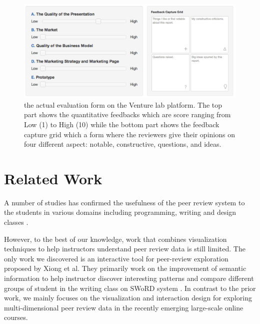 \documentclass{sigchi}
\begin{document}
\begin{figure}[!t]
\centering
\includegraphics[width=\columnwidth]{images/review-form}
\caption{the actual evaluation form on the Venture lab platform.
The top part shows the quantitative feedbacks which are score ranging
from Low (1) to High (10) while the bottom part shows the feedback capture grid
which a form where the reviewers give their opinions
on four different aspect: notable, constructive, questions, and ideas.}
\label{fig:review-form}
\end{figure}


\section{Related Work}

A number of studies has confirmed the usefulness of the peer review system
to the students in various domains including programming, writing and design classes
\cite{MyPeerReview,WebBasedPeerReview,de2009assessment}.

However, to the best of our knowledge, work that combines visualization
techniques to help instructors understand peer review data is still limited.
The only work we discovered is  an interactive tool for peer-review
exploration proposed by Xiong et al. \cite{xiong} They primarily work on the
improvement of semantic information to help instructor discover interesting
patterns and compare different groups of student in the writing class on SWoRD
system \cite{Cho2007}. In contrast to the prior work, we mainly focuses on the
visualization and interaction design for exploring multi-dimensional peer
review data in the recently emerging large-scale online courses.
\end{document}
